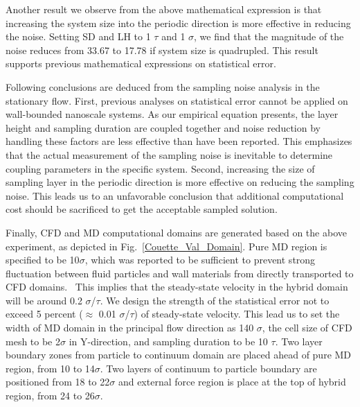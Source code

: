 \documentclass[preprint,12pt]{elsarticle}
\begin{document}
Another result we observe from the above mathematical expression is that increasing the system size into the periodic direction is more effective in reducing the noise. Setting SD and LH to 1 $\tau$ and 1 $\sigma$, we find that the magnitude of the noise reduces from 33.67 to 17.78 if system size is quadrupled. This result supports previous mathematical expressions on statistical error.




Following conclusions are deduced from the sampling noise analysis in the stationary flow. First, previous analyses on statistical error cannot be applied on wall-bounded nanoscale systems. As our empirical equation presents, the layer height and sampling duration are coupled together and noise reduction by handling these factors are less effective than have been reported. This emphasizes that the actual measurement of the sampling noise is inevitable to determine coupling parameters in the specific system.
Second, increasing the size of sampling layer in the periodic direction is more effective on reducing the sampling noise. This leads us to an unfavorable conclusion that additional computational cost should be sacrificed to get the acceptable sampled solution.


Finally, CFD and MD computational domains are generated based on the above experiment, as depicted in Fig.~\ref{Couette_Val_Domain}. Pure MD region is specified to be 10$\sigma$, which was reported to be sufficient to prevent strong fluctuation between fluid particles and wall materials from directly transported to CFD domains.~\cite{Yen} This implies that the steady-state velocity in the hybrid domain will be around 0.2 $\sigma$/$\tau$. We design the strength of the statistical error not to exceed 5 percent ($\approx$ 0.01 $\sigma$/$\tau$) of steady-state velocity. This lead us to set the width of MD domain in the principal flow direction as 140 $\sigma$, the cell size of CFD mesh to be 2$\sigma$ in Y-direction, and sampling duration to be 10 $\tau$. Two layer boundary zones from particle to continuum domain are placed ahead of pure MD region, from 10 to 14$\sigma$. Two layers of continuum to particle boundary are positioned from 18 to 22$\sigma$ and external force region is place at the top of hybrid region, from 24 to 26$\sigma$.
\end{document}
